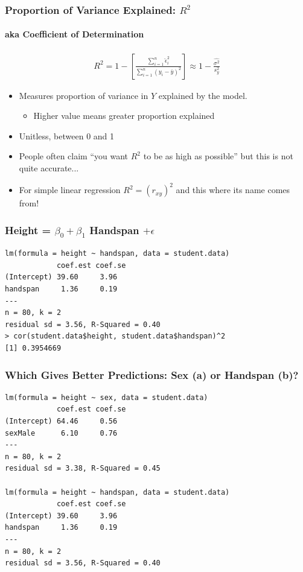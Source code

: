\documentclass{beamer}
\begin{document}
\begin{frame}
\frametitle{Proportion of Variance Explained: $R^2$}
\framesubtitle{aka Coefficient of Determination}
	\begin{eqnarray*}
		R^2 =  1 - \left[\frac{\sum_{i=1}^n \widehat{\epsilon}_i^2}{\sum_{i=1}^n (y_i - \bar{y})^2} \right]  \approx 1 - \frac{\widehat{\sigma^2}}{s_y^2}
	\end{eqnarray*}
		\begin{itemize}
			\item Measures proportion of variance in $Y$ explained by the model. 
			\begin{itemize}
			\item Higher value means greater proportion explained 
			\end{itemize}
			\item Unitless, between 0 and 1 
			\item People often claim ``you want $R^2$ to be as high as possible'' but this is not quite accurate... 
			\item \alert{For simple linear regression $R^2 = (r_{xy})^2$ and this where its name comes from!}
		\end{itemize}
\end{frame}



\begin{frame}[fragile]
\frametitle{Height = $\beta_0 + \beta_1$ Handspan $+ \epsilon$}
\footnotesize
\begin{verbatim}
lm(formula = height ~ handspan, data = student.data)
            coef.est coef.se
(Intercept) 39.60     3.96  
handspan     1.36     0.19  
---
n = 80, k = 2
residual sd = 3.56, R-Squared = 0.40
> cor(student.data$height, student.data$handspan)^2
[1] 0.3954669
\end{verbatim}
\end{frame}


\begin{frame}[fragile]
\frametitle{Which Gives Better Predictions: Sex (a) or Handspan (b)?}
\footnotesize
\begin{verbatim}
lm(formula = height ~ sex, data = student.data)
            coef.est coef.se
(Intercept) 64.46     0.56  
sexMale      6.10     0.76  
---
n = 80, k = 2
residual sd = 3.38, R-Squared = 0.45

lm(formula = height ~ handspan, data = student.data)
            coef.est coef.se
(Intercept) 39.60     3.96  
handspan     1.36     0.19  
---
n = 80, k = 2
residual sd = 3.56, R-Squared = 0.40
\end{verbatim}

\end{frame}
\end{document}
